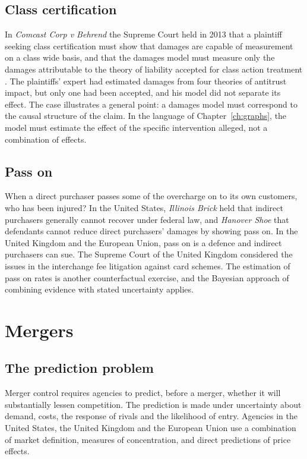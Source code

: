 \subsection{Class certification}

In \emph{Comcast Corp v Behrend} the Supreme Court held in 2013 that a plaintiff seeking class certification must show that damages are capable of measurement on a class wide basis, and that the damages model must measure only the damages attributable to the theory of liability accepted for class action treatment \citep{comcast2013}. The plaintiffs' expert had estimated damages from four theories of antitrust impact, but only one had been accepted, and his model did not separate its effect. The case illustrates a general point: a damages model must correspond to the causal structure of the claim. In the language of Chapter~\ref{ch:graphs}, the model must estimate the effect of the specific intervention alleged, not a combination of effects.

\subsection{Pass on}

When a direct purchaser passes some of the overcharge on to its own customers, who has been injured? In the United States, \emph{Illinois Brick} held that indirect purchasers generally cannot recover under federal law, and \emph{Hanover Shoe} that defendants cannot reduce direct purchasers' damages by showing pass on. In the United Kingdom and the European Union, pass on is a defence and indirect purchasers can sue. The Supreme Court of the United Kingdom considered the issues in the interchange fee litigation against card schemes. The estimation of pass on rates is another counterfactual exercise, and the Bayesian approach of combining evidence with stated uncertainty applies.

\section{Mergers}

\subsection{The prediction problem}

Merger control requires agencies to predict, before a merger, whether it will substantially lessen competition. The prediction is made under uncertainty about demand, costs, the response of rivals and the likelihood of entry. Agencies in the United States, the United Kingdom and the European Union use a combination of market definition, measures of concentration, and direct predictions of price effects.

